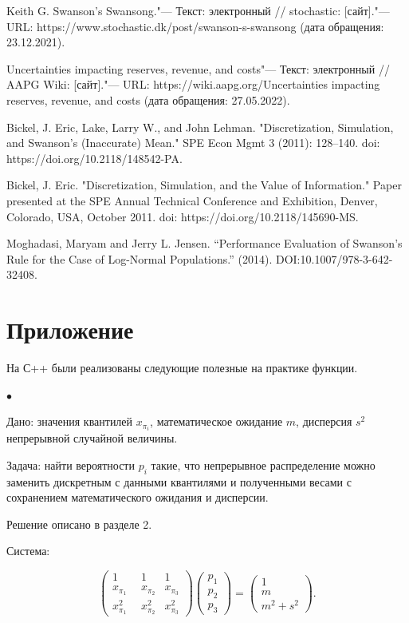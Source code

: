 \documentclass[12pt]{article}
\begin{document}
	\begin{thebibliography}{1}
		 Keith G. Swanson's Swansong."--- Текст: электронный // stochastic: [сайт]."--- URL: https://www.stochastic.dk/post/swanson-s-swansong (дата обращения: 23.12.2021).
		
		 Uncertainties impacting reserves, revenue, and costs"--- Текст: электронный // AAPG Wiki: [сайт]."--- URL: https://wiki.aapg.org/Uncertainties impacting reserves, revenue, and costs (дата обращения: 27.05.2022).
		
		 Bickel, J. Eric, Lake, Larry W., and John Lehman. "Discretization, Simulation, and Swanson's (Inaccurate) Mean." SPE Econ Mgmt 3 (2011): 128–140. doi: https://doi.org/10.2118/148542-PA.
		
		 Bickel, J. Eric. "Discretization, Simulation, and the Value of Information." Paper presented at the SPE Annual Technical Conference and Exhibition, Denver, Colorado, USA, October 2011. doi: https://doi.org/10.2118/145690-MS.
		
		 Moghadasi, Maryam and Jerry L. Jensen. “Performance Evaluation of Swanson’s Rule for the Case of Log-Normal Populations.” (2014). DOI:10.1007/978-3-642-32408.
		
		
	\end{thebibliography}
	
	\section{Приложение}
	
	На  С++ были реализованы следующие полезные на практике функции.
	
	$\bullet$ 
	
	Дано:
	значения квантилей $x_{\pi_{i}}$, математическое ожидание $m$, дисперсия $s^2$ непрерывной случайной величины.
	
	Задача:
	найти вероятности $p_{i}$ такие, что непрерывное распределение можно заменить дискретным с данными квантилями и полученными весами с сохранением математического ожидания и дисперсии.
	
	Решение описано в разделе 2.
	
	Система:
	
	\begin{equation*}
		\begin{pmatrix} 
			1&1&1\\ 
			x_{\pi_{1}} &  x_{\pi_{2}}  & x_{\pi_{3}} \\ 
			x_{\pi_{1}}^2~~&x_{\pi_{2}}^2  &x_{\pi_{3}}^2
		\end{pmatrix}
		\begin{pmatrix}p_{1}\\p_{2}\\ p_{3}\end{pmatrix}= \begin{pmatrix}1\\m\\m^{2}+s^{2}\end{pmatrix}.
	\end{equation*}
	
\end{document}
